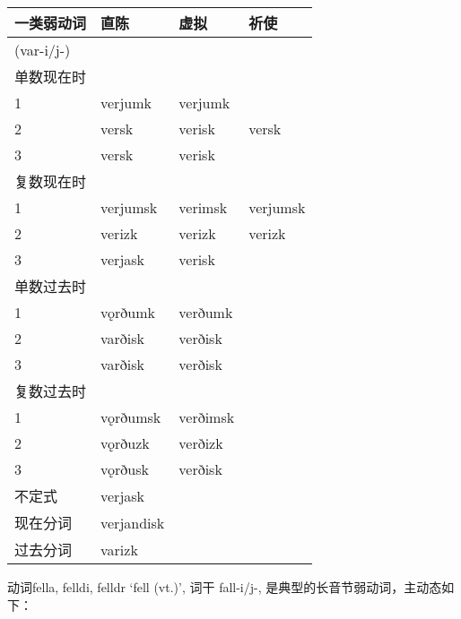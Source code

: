 \begin{longtable}{llll}
    \toprule
    一类弱动词 & 直陈       & 虚拟     & 祈使     \\
    \midrule
    \endhead
    \bottomrule
    \endfoot
    (var-i/j-) &            &          &          \\
    单数现在时 &            &          &          \\
    1          & verjumk    & verjumk  &          \\
    2          & versk      & verisk   & versk    \\
    3          & versk      & verisk   &          \\
    复数现在时 &            &          &          \\
    1          & verjumsk   & verimsk  & verjumsk \\
    2          & verizk     & verizk   & verizk   \\
    3          & verjask    & verisk   &          \\
    单数过去时 &            &          &          \\
    1          & vǫrðumk    & verðumk  &          \\
    2          & varðisk    & verðisk  &          \\
    3          & varðisk    & verðisk  &          \\
    复数过去时 &            &          &          \\
    1          & vǫrðumsk   & verðimsk &          \\
    2          & vǫrðuzk    & verðizk  &          \\
    3          & vǫrðusk    & verðisk  &          \\
    不定式     & verjask    &          &          \\
    现在分词   & verjandisk &          &          \\
    过去分词   & varizk     &          &          \\
\end{longtable}

动词fella, felldi, felldr `fell (vt.)‌', 词干 fall-i/j-,
是典型的长音节弱动词，主动态如下：

